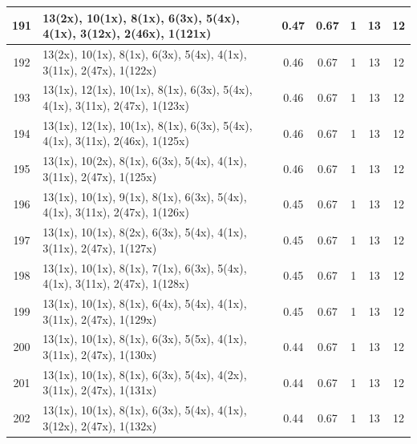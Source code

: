 \begin{small}
\begin{longtable}{|c|p{4cm}|c|c|c|c|c|}
  191 & 13(2x), 10(1x), 8(1x), 6(3x), 5(4x), 4(1x), 3(12x), 2(46x), 1(121x) & \cellcolor{colorGood}  0.47 & \cellcolor{colorGood} 0.67 & 1 & 13 & \cellcolor{colorGood} 12 \\   \hline
  192 & 13(2x), 10(1x), 8(1x), 6(3x), 5(4x), 4(1x), 3(11x), 2(47x), 1(122x) & \cellcolor{colorGood}  0.46 & \cellcolor{colorGood} 0.67 & 1 & 13 & \cellcolor{colorGood} 12 \\   \hline
  193 & 13(1x), 12(1x), 10(1x), 8(1x), 6(3x), 5(4x), 4(1x), 3(11x), 2(47x), 1(123x) & \cellcolor{colorGood}  0.46 & \cellcolor{colorGood} 0.67 & 1 & 13 & \cellcolor{colorGood} 12 \\   \hline
  194 & 13(1x), 12(1x), 10(1x), 8(1x), 6(3x), 5(4x), 4(1x), 3(11x), 2(46x), 1(125x) & \cellcolor{colorGood}  0.46 & \cellcolor{colorGood} 0.67 & 1 & 13 & \cellcolor{colorGood} 12 \\   \hline
  195 & 13(1x), 10(2x), 8(1x), 6(3x), 5(4x), 4(1x), 3(11x), 2(47x), 1(125x) & \cellcolor{colorGood}  0.46 & \cellcolor{colorGood} 0.67 & 1 & 13 & \cellcolor{colorGood} 12 \\   \hline
  196 & 13(1x), 10(1x), 9(1x), 8(1x), 6(3x), 5(4x), 4(1x), 3(11x), 2(47x), 1(126x) & \cellcolor{colorGood}  0.45 & \cellcolor{colorGood} 0.67 & 1 & 13 & \cellcolor{colorGood} 12 \\   \hline
  197 & 13(1x), 10(1x), 8(2x), 6(3x), 5(4x), 4(1x), 3(11x), 2(47x), 1(127x) & \cellcolor{colorGood}  0.45 & \cellcolor{colorGood} 0.67 & 1 & 13 & \cellcolor{colorGood} 12 \\   \hline
  198 & 13(1x), 10(1x), 8(1x), 7(1x), 6(3x), 5(4x), 4(1x), 3(11x), 2(47x), 1(128x) & \cellcolor{colorGood}  0.45 & \cellcolor{colorGood} 0.67 & 1 & 13 & \cellcolor{colorGood} 12 \\   \hline
  199 & 13(1x), 10(1x), 8(1x), 6(4x), 5(4x), 4(1x), 3(11x), 2(47x), 1(129x) & \cellcolor{colorGood}  0.45 & \cellcolor{colorGood} 0.67 & 1 & 13 & \cellcolor{colorGood} 12 \\   \hline
  200 & 13(1x), 10(1x), 8(1x), 6(3x), 5(5x), 4(1x), 3(11x), 2(47x), 1(130x) & \cellcolor{colorGood}  0.44 & \cellcolor{colorGood} 0.67 & 1 & 13 & \cellcolor{colorGood} 12 \\   \hline
  201 & 13(1x), 10(1x), 8(1x), 6(3x), 5(4x), 4(2x), 3(11x), 2(47x), 1(131x) & \cellcolor{colorGood}  0.44 & \cellcolor{colorGood} 0.67 & 1 & 13 & \cellcolor{colorGood} 12 \\   \hline
  202 & 13(1x), 10(1x), 8(1x), 6(3x), 5(4x), 4(1x), 3(12x), 2(47x), 1(132x) & \cellcolor{colorGood}  0.44 & \cellcolor{colorGood} 0.67 & 1 & 13 & \cellcolor{colorGood} 12 \\   \hline

\end{longtable}
\end{small}
